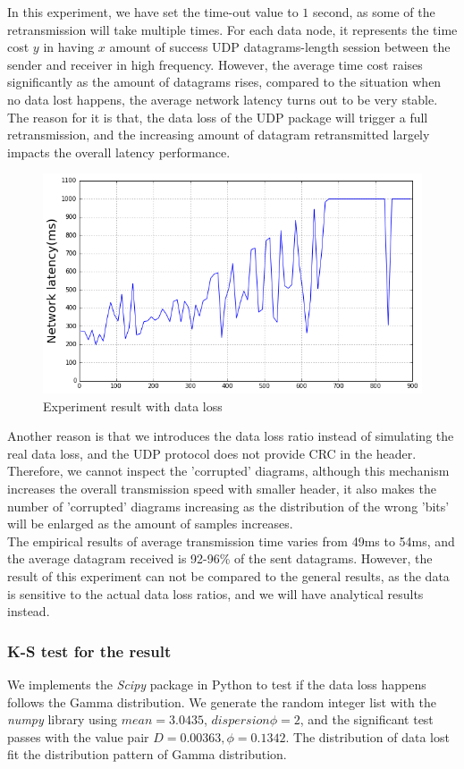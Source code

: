 \documentclass[11pt,openright,a4paper]{report}
\begin{document}
In this experiment, we have set the time-out value to $1$ second, as some of the retransmission will take multiple times. For each data node, it represents the time cost $y$ in having $x$ amount of success UDP datagrams-length session between the sender and receiver in high frequency. However, the average time cost raises significantly as the amount of datagrams rises, compared to the situation when no data lost happens, the average network latency turns out to be very stable. The reason for it is that, the data loss of the UDP package will trigger a full retransmission, and the increasing amount of datagram retransmitted largely impacts the overall latency performance.\\
\begin{figure}[H]
	\centering
	\includegraphics[width=0.6\linewidth]{picture/experiments/exp1/dataLoss}
	\caption{Experiment result with data loss}
	\label{fig:dataLoss}
\end{figure}
Another reason is that we introduces the data loss ratio instead of simulating the real data loss, and the UDP protocol does not provide CRC in the header. Therefore, we cannot inspect the 'corrupted' diagrams, although this mechanism increases the overall transmission speed with smaller header, it also makes the number of 'corrupted' diagrams increasing as the distribution of the wrong 'bits' will be enlarged as the amount of samples increases.\\
The empirical results of average transmission time varies from 49ms to 54ms, and the average datagram received is 92-96\% of the sent datagrams. However, the result of this experiment can not be compared to the general results, as the data is sensitive to the actual data loss ratios, and we will have analytical results instead.\\
\subsubsection{K-S test for the result}
We implements the \textit{Scipy} package in Python to test if the data loss happens follows the Gamma distribution\cite{scipy}. We generate the random integer list with the \textit{numpy} library using $mean=3.0435$, $dispersion \phi =2$, and the significant test passes with the value pair $D=0.00363, \phi = 0.1342$. The distribution of data lost fit the distribution pattern of Gamma distribution.\\
\end{document}
